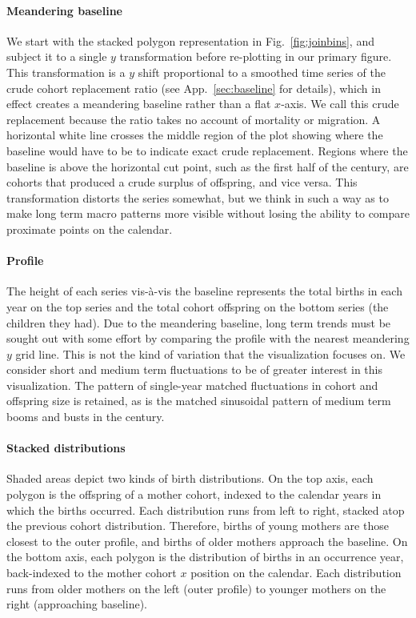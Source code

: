 \documentclass{article}
\begin{document}
\paragraph{Meandering baseline} We start with the stacked polygon representation in Fig.~\ref{fig:joinbins}, and subject it to a single $y$ transformation before re-plotting in our primary figure. This transformation is a $y$ shift proportional to a smoothed time series of the crude cohort replacement ratio (see App.~\ref{sec:baseline} for details), which in effect creates a meandering baseline rather than a flat $x$-axis. We call this crude replacement because the ratio takes no account of mortality or migration. A horizontal white line crosses the middle region of the plot showing where the baseline would have to be to indicate exact crude replacement. Regions where the baseline is above the horizontal cut point, such as the first half of the  century, are cohorts that produced a crude surplus of offspring, and vice versa. This transformation distorts the series somewhat, but we think in such a way as to make long term macro patterns more visible without losing the ability to compare proximate points on the calendar.

\paragraph{Profile} The height of each series vis-\`a-vis the baseline represents the total births in each year on the top series and the total cohort offspring on the bottom series (the children they had). Due to the meandering baseline, long term trends must be sought out with some effort by comparing the profile with the nearest meandering $y$ grid line. This is not the kind of variation that the visualization focuses on. We consider short and medium term fluctuations to be of greater interest in this visualization. The pattern of single-year matched fluctuations in cohort and offspring size is retained, as is the matched sinusoidal pattern of medium term booms and busts in the  century.

\paragraph{Stacked distributions} Shaded areas depict two kinds of birth distributions. On the top axis, each polygon is the offspring of a mother cohort, indexed to the calendar years in which the births occurred. Each distribution runs from left to right, stacked atop the previous cohort distribution. Therefore, births of young mothers are those closest to the outer profile, and births of older mothers approach the baseline. On the bottom axis, each polygon is the distribution of births in an occurrence year, back-indexed to the mother cohort $x$ position on the calendar. Each distribution runs from older mothers on the left (outer profile) to younger mothers on the right (approaching baseline).
\end{document}
